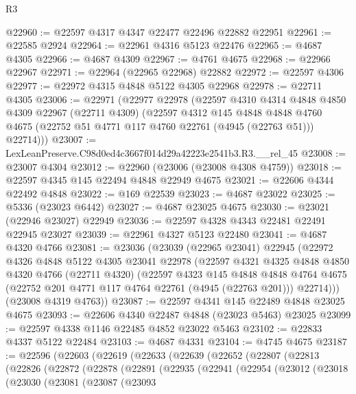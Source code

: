 \begin{lexlean}{R3}
\begin{coremodule}
@22960 := @22597 @4317 @4347 @22477 @22496 @22882 @22951
@22961 := @22585 @2924
@22964 := @22961 @4316 @5123 @22476
@22965 := @4687 @4305
@22966 := @4687 @4309
@22967 := @4761 @4675
@22968 := @22966 @22967
@22971 := @22964 (@22965 @22968) @22882
@22972 := @22597 @4306
@22977 := @22972 @4315 @4848 @5122 @4305 @22968
@22978 := @22711 @4305
@23006 := @22971
    (@22977
      @22978
      (@22597
        @4310
        @4314
        @4848
        @4850
        @4309
        @22967
        (@22711 @4309)
        (@22597
          @4312
          @145
          @4848
          @4848
          @4760
          @4675
          (@22752 @51 @4771 @117 @4760 @22761 (@4945 (@22763 @51)))
          @22714)))
@23007 := LexLeanPreserve.C98d0ed4c3667f014d29a42223e2541b3.R3.__rel_45
@23008 := @23007 @4304
@23012 := @22960 (@23006 (@23008 @4308 @4759))
@23018 := @22597 @4345 @145 @22494 @4848 @22949 @4675
@23021 := @22606 @4344 @22492 @4848
@23022 := @169 @22539
@23023 := @4687 @23022
@23025 := @5336 (@23023 @6442)
@23027 := @4687 @23025 @4675
@23030 := @23021 (@22946 @23027) @22949
@23036 := @22597 @4328 @4343 @22481 @22491 @22945 @23027
@23039 := @22961 @4327 @5123 @22480
@23041 := @4687 @4320 @4766
@23081 := @23036
    (@23039
      (@22965 @23041)
      @22945
      (@22972
        @4326
        @4848
        @5122
        @4305
        @23041
        @22978
        (@22597
          @4321
          @4325
          @4848
          @4850
          @4320
          @4766
          (@22711 @4320)
          (@22597
            @4323
            @145
            @4848
            @4848
            @4764
            @4675
            (@22752 @201 @4771 @117 @4764 @22761 (@4945 (@22763 @201)))
            @22714)))
      (@23008 @4319 @4763))
@23087 := @22597 @4341 @145 @22489 @4848 @23025 @4675
@23093 := @22606 @4340 @22487 @4848 (@23023 @5463) @23025
@23099 := @22597 @4338 @1146 @22485 @4852 @23022 @5463
@23102 := @22833 @4337 @5122 @22484
@23103 := @4687 @4331
@23104 := @4745 @4675
@23187 := @22596
    (@22603
      (@22619
        (@22633
          (@22639
            (@22652
              (@22807
                (@22813
                  (@22826
                    (@22872
                      (@22878
                        (@22891
                          (@22935
                            (@22941
                              (@22954
                                (@23012
                                  (@23018
                                    (@23030
                                      (@23081
                                        (@23087
                                          (@23093

\end{coremodule}
\end{lexlean}

